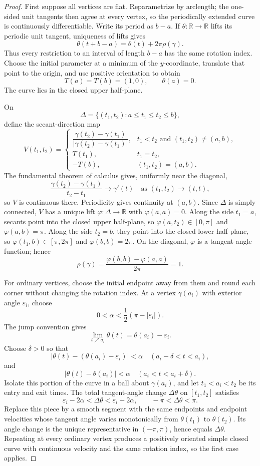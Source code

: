 \begin{proof}
\sketch First suppose all vertices are flat. Reparametrize by arclength; the
one-sided unit tangents then agree at every vertex, so the periodically
extended curve is continuously differentiable. Write its period as $b-a$. If
$\theta\colon\mathbb R\to\mathbb R$ lifts its periodic unit tangent, uniqueness
of lifts gives
\begin{equation}
\theta(t+b-a)=\theta(t)+2\pi\rho(\gamma). \tag{9.3}
\end{equation}
Thus every restriction to an interval of length $b-a$ has the same rotation
index. Choose the initial parameter at a minimum of the $y$-coordinate,
translate that point to the origin, and use positive orientation to obtain
\[
T(a)=T(b)=(1,0),
\qquad \theta(a)=0.
\]
The curve lies in the closed upper half-plane.

On
\[
\Delta=\{(t_1,t_2):a\leq t_1\leq t_2\leq b\},
\]
define the secant-direction map
\[
V(t_1,t_2)=
\begin{cases}
\dfrac{\gamma(t_2)-\gamma(t_1)}
{|\gamma(t_2)-\gamma(t_1)|},
&t_1<t_2\text{ and }(t_1,t_2)\ne(a,b),\\[2mm]
T(t_1),&t_1=t_2,\\
-T(b),&(t_1,t_2)=(a,b).
\end{cases}
\]
The fundamental theorem of calculus gives, uniformly near the diagonal,
\[
\frac{\gamma(t_2)-\gamma(t_1)}{t_2-t_1}\longrightarrow\gamma'(t)
\quad\text{as }(t_1,t_2)\to(t,t),
\]
so $V$ is continuous there. Periodicity gives continuity at $(a,b)$. Since
$\Delta$ is simply connected, $V$ has a unique lift
$\varphi\colon\Delta\to\mathbb R$ with $\varphi(a,a)=0$. Along the side
$t_1=a$, secants point into the closed upper half-plane, so
$\varphi(a,t_2)\in[0,\pi]$ and $\varphi(a,b)=\pi$. Along the side $t_2=b$,
they point into the closed lower half-plane, so
$\varphi(t_1,b)\in[\pi,2\pi]$ and $\varphi(b,b)=2\pi$. On the diagonal,
$\varphi$ is a tangent angle function; hence
\[
\rho(\gamma)
=\frac{\varphi(b,b)-\varphi(a,a)}{2\pi}=1.
\]

For ordinary vertices, choose the initial endpoint away from them and round
each corner without changing the rotation index. At a vertex $\gamma(a_i)$
with exterior angle $\varepsilon_i$, choose
\[
0<\alpha<\frac12(\pi-|\varepsilon_i|).
\]
The jump convention gives
\[
\lim_{t\nearrow a_i}\theta(t)=\theta(a_i)-\varepsilon_i.
\]
Choose $\delta>0$ so that
\[
|\theta(t)-(\theta(a_i)-\varepsilon_i)|<\alpha
\quad(a_i-\delta<t<a_i),
\]
and
\[
|\theta(t)-\theta(a_i)|<\alpha
\quad(a_i<t<a_i+\delta).
\]
Isolate this portion of the curve in a ball about $\gamma(a_i)$, and let
$t_1<a_i<t_2$ be its entry and exit times. The total tangent-angle change
$\Delta\theta$ on $[t_1,t_2]$ satisfies
\[
\varepsilon_i-2\alpha<\Delta\theta<\varepsilon_i+2\alpha,
\qquad -\pi<\Delta\theta<\pi.
\]
Replace this piece by a smooth segment with the same endpoints and endpoint
velocities whose tangent angle varies monotonically from $\theta(t_1)$ to
$\theta(t_2)$. Its angle change is the unique representative in
$(-\pi,\pi)$, hence equals $\Delta\theta$. Repeating at every ordinary vertex
produces a positively oriented simple closed curve with continuous velocity
and the same rotation index, so the first case applies.
\end{proof}
